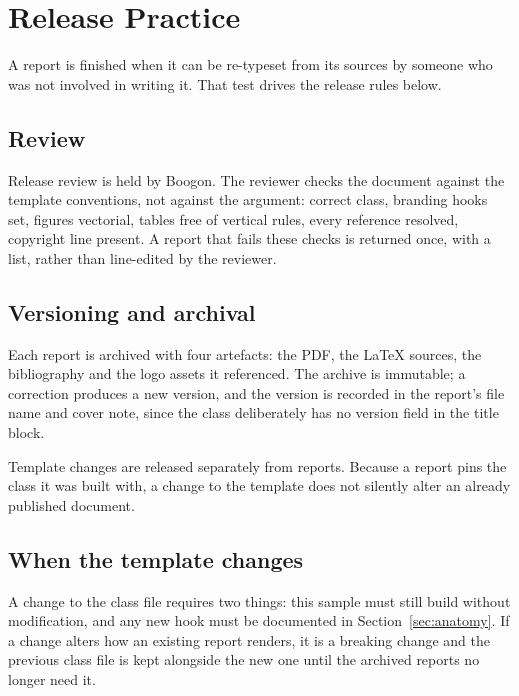 \section{Release Practice}
\label{sec:release}

A report is finished when it can be re-typeset from its sources by someone who was not involved
in writing it. That test drives the release rules below.

\subsection{Review}

Release review is held by Boogon. The reviewer checks the document against the template
conventions, not against the argument: correct class, branding hooks set, figures vectorial,
tables free of vertical rules, every reference resolved, copyright line present. A report that
fails these checks is returned once, with a list, rather than line-edited by the reviewer.

\subsection{Versioning and archival}

Each report is archived with four artefacts: the PDF, the \LaTeX{} sources, the bibliography and
the logo assets it referenced. The archive is immutable; a correction produces a new version,
and the version is recorded in the report's file name and cover note, since the class
deliberately has no version field in the title block.

Template changes are released separately from reports. Because a report pins the class it was
built with, a change to the template does not silently alter an already published document.

\subsection{When the template changes}

A change to the class file requires two things: this sample must still build without
modification, and any new hook must be documented in Section~\ref{sec:anatomy}. If a change
alters how an existing report renders, it is a breaking change and the previous class file is
kept alongside the new one until the archived reports no longer need it.
